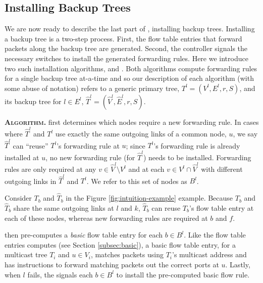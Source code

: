 

\subsection{Installing Backup Trees}
\label{subsec:install-backups}

We are now ready to describe the last part of \mdrs, installing backup trees.  %
Installing a backup tree is a two-step process. First, the flow table entries that forward packets along the backup tree are generated.  Second, the 
controller signals the necessary switches to install the generated forwarding rules.  Here we introduce two such installation algorithms, \pre and \posts.
Both algorithms compute forwarding rules for a single backup tree at-a-time and so
our description of each algorithm (with some abuse of notation) refers to a generic primary tree, $T^l = (V^l,E^l,r,S)$, and its backup tree for $l \in E^l$, $\hat{T}^l=(\hat{V}^l,\hat{E}^l,r,S)$.  

{\bf \post \textsc{Algorithm.}}
\post first determines which nodes require a new forwarding rule. %
 In cases where $\hat{T}^l$ and $T^l$ use exactly the same outgoing links of a common node, $u$, we say
$\hat{T}^l$ can ``reuse'' $T^l$'s forwarding rule at $u$;  since $T^l$'s forwarding rule is already installed at $u$, no new forwarding rule (for $\hat{T}^l$) needs to be installed. %
Forwarding rules are only required at any $v \in \hat{V}^l \setminus V^l$ and at each $v \in V^l \cap \hat{V}^l$ with different outgoing links in $\hat{T}^l$ and $T^l$.  We refer to this
set of nodes as $B^l$. 

Consider $T_b$ and $\hat{T}_b$ in the Figure \ref{fig:intuition-example} example. Because $T_b$ and $\hat{T}_b$ share the same outgoing links at $l$ and $k$,
$\hat{T}_b$ can reuse $T_b$'s flow table entry at each of these nodes, whereas new forwarding rules are required at $b$ and $f$.

\post then pre-computes a \emph{basic} flow table entry for each $b \in B^l$.  Like the flow table entries \base computes (see Section \ref{subsec:basic}), a basic flow table
entry, for a multicast tree $T_i$ and $u \in V_i$, matches packets using $T_i$'s multicast address and has instructions to forward matching packets out the correct ports at $u$. 
Lastly, when $l$ fails, the \post signals each $b \in B^l$ to install the pre-computed basic flow rule.


